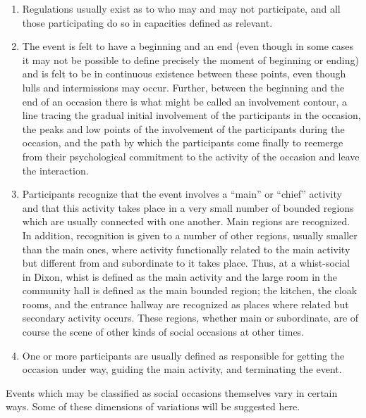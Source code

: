 \documentclass[openany,nobib]{tufte-book}
\begin{document}
\begin{enumerate}
\item
  Regulations usually exist as to who may and may not participate, and
  all those participating do so in capacities defined as relevant.
\item
  The event is felt to have a beginning and an end (even though in some
  cases it may not be possible to define precisely the moment of
  beginning or ending) and is felt to be in continuous existence between
  these points, even though lulls and intermissions may occur. Further,
  between the beginning and the end of an occasion there is what might
  be called an involvement contour, a line tracing the gradual initial
  involvement of the participants in the occasion, the peaks and low
  points of the involvement of the participants during the occasion, and
  the path by which the participants come finally to reemerge from their
  psychological commitment to the activity of the occasion and leave the
  interaction.
\item
  Participants recognize that the event involves a ``main'' or ``chief''
  activity and that this activity takes place in a very small number of
  bounded regions which are usually connected with one another. Main
  regions are recognized. In addition, recognition is given to a number
  of other regions, usually smaller than the main ones, where activity
  functionally related to the main activity but different from and
  subordinate to it takes place. Thus, at a whist-social in Dixon, whist
  is defined as the main activity and the large room in the community
  hall is defined as the main bounded region; the kitchen, the cloak
  rooms, and the entrance hallway are recognized as places where related
  but secondary activity occurs. These regions, whether main or
  subordinate, are of course the scene of other kinds of social
  occasions at other times.
\item
  One or more participants are usually defined as responsible for
  getting the occasion under way, guiding the main activity, and
  terminating the event.
\end{enumerate}

Events which may be classified as social occasions themselves vary in
certain ways. Some of these dimensions of variations will be suggested
here.
\end{document}
